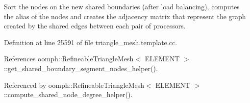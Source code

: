 Sort the nodes on the new shared boundaries (after load balancing), computes the alias of the nodes and creates the adjacency matrix that represent the graph created by the shared edges between each pair of processors. 



Definition at line 25591 of file triangle\+\_\+mesh.\+template.\+cc.



References oomph\+::\+Refineable\+Triangle\+Mesh$<$ E\+L\+E\+M\+E\+N\+T $>$\+::get\+\_\+shared\+\_\+boundary\+\_\+segment\+\_\+nodes\+\_\+helper().



Referenced by oomph\+::\+Refineable\+Triangle\+Mesh$<$ E\+L\+E\+M\+E\+N\+T $>$\+::compute\+\_\+shared\+\_\+node\+\_\+degree\+\_\+helper().

\mbox{\label{classoomph_1_1RefineableTriangleMesh_a27d0ec7e44fc3adebf78d5e581d79e6d}} 
